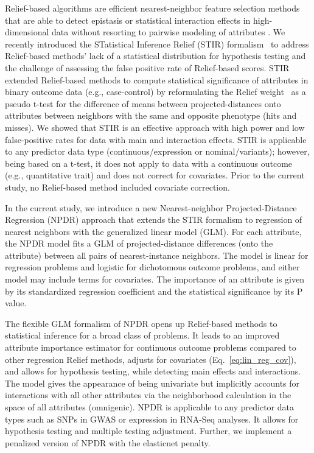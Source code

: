 \documentclass[10pt]{article}
\begin{document}
Relief-based algorithms are efficient nearest-neighbor feature selection methods that are able to detect epistasis or statistical interaction effects in high-dimensional data without resorting to pairwise modeling of attributes \cite{urbanowicz17b,kononenko97, mckinney09, robnik2003theoretical}.
We recently introduced the STatistical Inference Relief (STIR) formalism~\cite{stir} to address Relief-based methods' lack of a statistical distribution for hypothesis testing and the challenge of assessing the false positive rate of Relief-based scores.
STIR extended Relief-based methods to compute statistical significance of attributes in binary outcome data (e.g., case-control) by reformulating the Relief weight~\cite{mckinney13} as a pseudo t-test for the difference of means between projected-distances onto attributes between neighbors with the same and opposite phenotype (hits and misses). We showed that STIR is an effective approach with high power and low false-positive rates for data with main and interaction effects. 
STIR is applicable to any predictor data type (continuous/expression or nominal/variants); however, being based on a t-test, it does not apply to data with a continuous outcome (e.g., quantitative trait) and does not correct for covariates.
Prior to the current study, no Relief-based method included covariate correction.  

In the current study, we introduce a new Nearest-neighbor Projected-Distance Regression (NPDR) approach that extends the STIR formalism to regression of nearest neighbors with the generalized linear model (GLM). For each attribute, the NPDR model fits a GLM of projected-distance differences (onto the attribute) between all pairs of nearest-instance neighbors.
The model is linear for regression problems and logistic for dichotomous outcome problems, and either model may include terms for covariates.
The importance of an attribute is given by its standardized regression coefficient and the statistical significance by its P value.

The flexible GLM formalism of NPDR opens up Relief-based methods to statistical inference for a broad class of problems.
It leads to an improved attribute importance estimator for continuous outcome problems compared to other regression Relief methods, adjusts for covariates (Eq.~\ref{eq:lin_reg_cov}), and allows for hypothesis testing, while detecting main effects and interactions. The model gives the appearance of being univariate but implicitly accounts for interactions with all other attributes via the neighborhood calculation in the space of all attributes (omnigenic).
NPDR is applicable to any predictor data types such as SNPs in GWAS or expression in RNA-Seq analyses.
It allows for hypothesis testing and multiple testing adjustment. Further, we implement a penalized version of NPDR with the elasticnet penalty.
\end{document}
